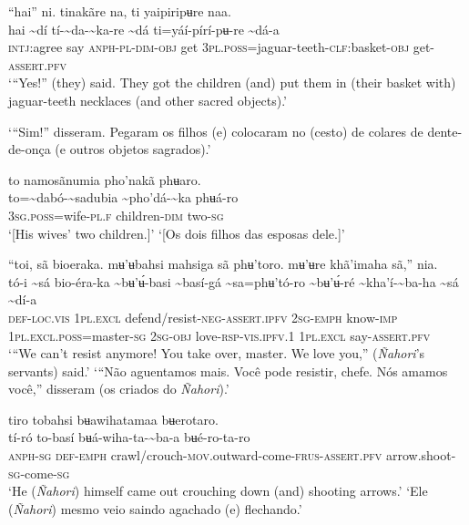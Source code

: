 \documentclass[output=paper,
modfonts,nonflat
]{langsci/langscibook}
\begin{document}
   
\ea “hai” ni. tinakãre na, ti yaipiripʉre naa. \\[.3em]
\gll hai	{\textasciitilde}dí	tí-{\textasciitilde}da-{\textasciitilde}ka-re	{\textasciitilde}dá	ti=yáí-pírí-pʉ-re	{\textasciitilde}dá-a \\
     \textsc{intj:}agree	say	\textsc{anph-pl-dim-obj}	get	3\textsc{pl.poss}=jaguar-teeth-\textsc{clf:}basket\textsc{-obj}	get-\textsc{assert.pfv} \\
\glt ‘“Yes!” (they) said. They got the children (and) put them in (their basket with) jaguar-teeth necklaces (and other sacred objects).’
 
\glt ‘“Sim!” disseram. Pegaram os filhos (e) colocaram no (cesto) de colares de dente-de-onça (e outros objetos sagrados).’
\z

\ea to namosãnumia pho'nakã phʉaro. \\[.3em]
\gll to={\textasciitilde}dabó-{\textasciitilde}sadubia	{\textasciitilde}pho'dá-{\textasciitilde}ka	phʉá-ro \\
     3\textsc{sg.poss}=wife-\textsc{pl.f}	children-\textsc{dim}	two\textsc{-sg} \\
\glt ‘[His wives’ two children.]’
\glt ‘[Os dois filhos das esposas dele.]’
\z 

\ea “toi, sã bioeraka. mʉ'ʉbahsi mahsiga sã phʉ'toro. mʉ'ʉre khã'imaha sã,” nia. \\[.3em]
\gll tó-i	{\textasciitilde}sá	bio-éra-ka {\textasciitilde}bʉ'ʉ́-basi	{\textasciitilde}basí-gá	{\textasciitilde}sa=phʉ'tó-ro  {\textasciitilde}bʉ'ʉ́-ré	{\textasciitilde}kha'í-{\textasciitilde}ba-ha	{\textasciitilde}sá	{\textasciitilde}dí-a\\
    \textsc{def-loc.vis}	\textsc{1pl.excl}	defend/resist\textsc{-neg-assert.ipfv} 2\textsc{sg-emph}	know-\textsc{imp}	1\textsc{pl.excl.poss}=master\textsc{-sg} 2\textsc{sg-obj}	love-\textsc{rsp-vis.ipfv.1}	1\textsc{pl.excl}	say-\textsc{assert.pfv} \\
\glt ‘“We can't resist anymore! You take over, master. We love you,” (\textit{Ñahori}’s servants) said.’
\glt ‘“Não aguentamos mais. Você pode resistir, chefe. Nós amamos você,” disseram (os criados do \textit{Ñahori}).’
\z 

\ea tiro tobahsi bʉawihatamaa bʉerotaro. \\[.3em]
\gll tí-ró	to-basí	bʉá-wiha-ta-{\textasciitilde}ba-a	bʉé-ro-ta-ro \\
     \textsc{anph-sg}	\textsc{def-emph}	crawl/crouch-\textsc{mov.}outward-come-\textsc{frus-assert.pfv}	arrow.shoot\textsc{-sg}-come\textsc{-sg} \\
\glt ‘He (\textit{Ñahori}) himself came out crouching down (and) shooting arrows.’
\glt ‘Ele (\textit{Ñahori}) mesmo veio saindo agachado (e) flechando.’
\z 
\end{document}
